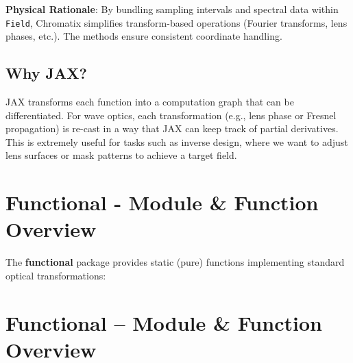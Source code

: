 \documentclass[a4paper,12pt]{report}
\begin{document}
\noindent\textbf{Physical Rationale}: By bundling sampling intervals and spectral data within \texttt{Field}, Chromatix simplifies transform-based operations (Fourier transforms, lens phases, etc.). The methods ensure consistent coordinate handling.

\subsection{Why JAX?}
JAX transforms each function into a computation graph that can be differentiated. For wave optics, each transformation (e.g., lens phase or Fresnel propagation) is re-cast in a way that JAX can keep track of partial derivatives. This is extremely useful for tasks such as inverse design, where we want to adjust lens surfaces or mask patterns to achieve a target field.

\section{Functional - Module \& Function Overview}
The \textbf{functional} package provides static (pure) functions implementing standard optical transformations:

\section{Functional – Module \& Function Overview}
\end{document}
